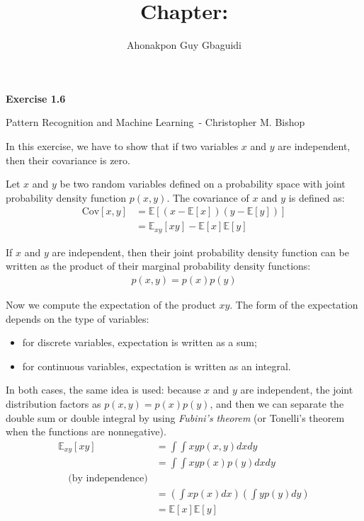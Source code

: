 \documentclass{article}
\title{Chapter: \ChapterName}
\author{Ahonakpon Guy Gbaguidi}
\date{}
\newcommand{\BookName}{Pattern Recognition and Machine Learning}
\newcommand{\BookAuthor}{Christopher M. Bishop}
\newcommand{\ExerciseID}{1.6}
\begin{document}
\maketitle

\begin{center}
  \large\textbf{Exercise \ExerciseID}

  \vspace{0.5em}

  \normalsize\BookName\ - \BookAuthor
\end{center}

\begin{tcolorbox}[breakable,colback=gray!5,colframe=gray!60,title=Solution]
In this exercise, we have to show that if two variables $x$ and $y$ are independent,
then their covariance is zero.
\par\medskip
Let $x$ and $y$ be two random variables defined on a probability space with joint probability 
density function $p(x, y)$. The covariance of $x$ and $y$ is defined as:
\begin{align*}
  \text{Cov}[x, y] &= \mathbb{E}[(x - \mathbb{E}[x])(y - \mathbb{E}[y])] \\
  &= \mathbb{E}_{xy}[xy] - \mathbb{E}[x]\mathbb{E}[y]
\end{align*}

If $x$ and $y$ are independent, then their joint probability density function can be 
written as the product of their marginal probability density functions:
\begin{align*}
  p(x, y) = p(x) p(y)
\end{align*}

Now we compute the expectation of the product $xy$. The form of the expectation depends
on the type of variables:
\begin{itemize}
  \item for discrete variables, expectation is written as a sum;
  \item for continuous variables, expectation is written as an integral.
\end{itemize}
In both cases, the same idea is used: because $x$ and $y$ are independent, the joint
distribution factors as $p(x,y)=p(x)p(y)$, and then we can separate the double sum or
double integral by using 	\textit{Fubini's theorem} (or Tonelli's theorem when the functions
are nonnegative).
\begin{align*}
  \mathbb{E}_{xy}[xy] &= \int \int xy p(x, y) dx dy \\
  &= \int \int xy p(x) p(y) dx dy \\ \quad\text{(by independence)} \\
  &= \left( \int x p(x) dx \right) \left( \int y p(y) dy \right) \\
  &= \mathbb{E}[x] \mathbb{E}[y]
\end{align*}


\end{tcolorbox}
\end{document}

